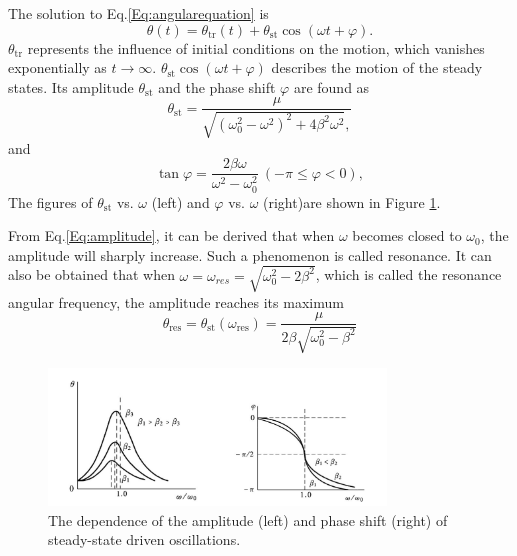 \documentclass[a4paper]{article}
\begin{document}
The solution to Eq.\ref{Eq:angularequation} is
\begin{equation}\label{Eq:angularsolution}
\theta(t)=\theta_{\mathrm{tr}}(t)+\theta_{\mathrm{st}} \cos (\omega t+\varphi).
\end{equation}
$\theta_{\mathrm{tr}}$ represents the influence of initial conditions on the motion, which vanishes exponentially as $t \rightarrow \infty$. $\theta_{\mathrm{st}} \cos (\omega t+\varphi)$ describes the motion of the steady states. Its amplitude $\theta_{\mathrm{st}}$ and the phase shift $\varphi$ are found as
\begin{equation}\label{Eq:amplitude}
\theta_{\mathrm{st}}=\frac{\mu}{\sqrt{\left(\omega_{0}^{2}-\omega^{2}\right)^{2}+4 \beta^{2} \omega^{2}},}
\end{equation}
and
\begin{equation}\label{Eq:phaselag}
\tan \varphi=\frac{2 \beta \omega}{\omega^{2}-\omega_{0}^{2}} \: (-\pi \leq \varphi<0),
\end{equation}
The figures of $\theta_{\mathrm{st}}$ vs. $\omega$ (left) and $\varphi$ vs. $\omega$ (right)are shown in Figure \ref{Fig:graph}.

From Eq.\ref{Eq:amplitude}, it can be derived that when $\omega$ becomes closed to $\omega_{0}$, the amplitude will sharply increase. Such a phenomenon is called resonance. It can also be obtained that when $\omega = \omega_{res} = \sqrt{\omega_{0}^{2}-2 \beta^{2}}$, which is called the resonance angular frequency, the amplitude reaches its maximum
\begin{equation}\label{Eq:resonanceamplitude}
\theta_{\mathrm{res}}=\theta_{\mathrm{st}}\left(\omega_{\mathrm{res}}\right)=\frac{\mu}{2 \beta \sqrt{\omega_{0}^{2}-\beta^{2}}}
\end{equation}

\begin{figure}[htpb]
\begin{center}
\includegraphics[width=0.8\textwidth]{graph.png}
\caption{The dependence of the amplitude (left) and phase shift (right) of steady-state driven oscillations.}\label{Fig:graph}
\end{center}
\end{figure}
\end{document}
